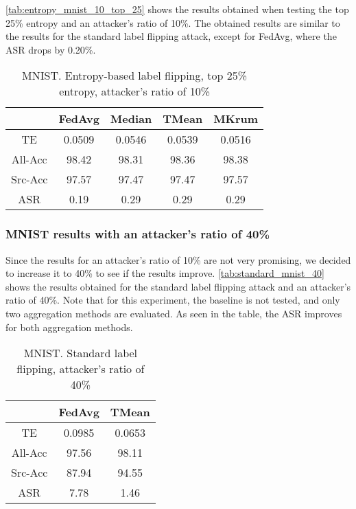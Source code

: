 \autoref{tab:entropy_mnist_10_top_25} shows the results obtained when testing the top 25\% entropy and an attacker's ratio of 10\%.
The obtained results are similar to the results for the standard label flipping attack, except for FedAvg, where the ASR drops by 0.20\%.
\begin{table}[h!]
        \centering
        \begin{tabular}{|c|c|c|c|c|}
            \hline
            & FedAvg & Median & TMean & MKrum \\
            \hline
            TE & 0.0509 & 0.0546 & 0.0539 & 0.0516 \\
            \hline
            All-Acc & 98.42 & 98.31 & 98.36 & 98.38 \\
            \hline
            Src-Acc & 97.57 & 97.47 & 97.47 & 97.57 \\
            \hline
            ASR & 0.19 & 0.29 & 0.29 & 0.29 \\
            \hline
        \end{tabular}
        \caption{MNIST. Entropy-based label flipping, top 25\% entropy, attacker's ratio of 10\%}
        \label{tab:entropy_mnist_10_top_25}
    \end{table}

\subsubsection{MNIST results with an attacker's ratio of 40\%}

Since the results for an attacker's ratio of 10\% are not very promising, we decided to increase it to 40\% to see if the results improve.
\autoref{tab:standard_mnist_40} shows the results obtained for the standard label flipping attack and an attacker's ratio of 40\%. Note that for this experiment, the baseline is not tested, and only two aggregation methods are evaluated.
As seen in the table, the ASR improves for both aggregation methods.
\begin{table}[h!]
        \centering
        \begin{tabular}{|c|c|c|}
            \hline
            & FedAvg & TMean \\
            \hline
            TE & 0.0985 & 0.0653 \\
            \hline
            All-Acc & 97.56 & 98.11 \\
            \hline
            Src-Acc & 87.94 & 94.55 \\
            \hline
            ASR & 7.78 & 1.46 \\
            \hline
        \end{tabular}
        \caption{MNIST. Standard label flipping, attacker's ratio of 40\%}
        \label{tab:standard_mnist_40}
    \end{table}
    
